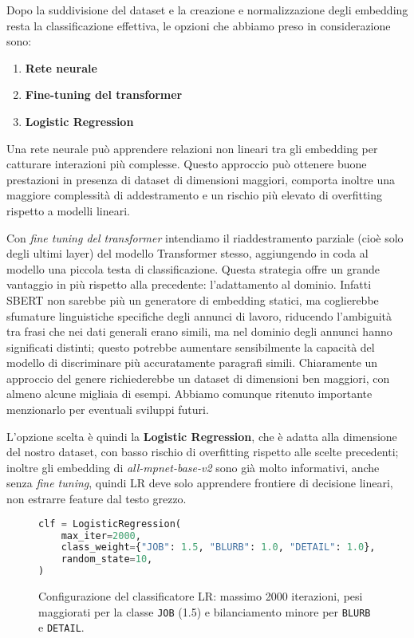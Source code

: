 \noindent Dopo la suddivisione del dataset e la creazione e normalizzazione degli embedding resta la classificazione effettiva, le opzioni che abbiamo preso in considerazione sono:

\begin{enumerate}
    \item \textbf{Rete neurale}
    \item \textbf{Fine-tuning del transformer}
    \item \textbf{Logistic Regression}
\end{enumerate}

\noindent Una rete neurale può apprendere relazioni non lineari tra gli embedding per catturare interazioni più complesse. Questo approccio può ottenere buone prestazioni in presenza di dataset di dimensioni maggiori, comporta inoltre una maggiore complessità di addestramento e un rischio più elevato di overfitting rispetto a modelli lineari.

\noindent Con \textit{fine tuning del transformer} intendiamo il riaddestramento parziale (cioè solo degli ultimi layer) del modello Transformer stesso, aggiungendo in coda al modello una piccola testa di classificazione. Questa strategia offre un grande vantaggio in più rispetto alla precedente: l'adattamento al dominio. Infatti SBERT non sarebbe più un generatore di embedding statici, ma coglierebbe sfumature linguistiche specifiche degli annunci di lavoro, riducendo l’ambiguità tra frasi che nei dati generali erano simili, ma nel dominio degli annunci hanno significati distinti; questo potrebbe aumentare sensibilmente la capacità del modello di discriminare più accuratamente paragrafi simili. Chiaramente un approccio del genere richiederebbe un dataset di dimensioni ben maggiori, con almeno alcune migliaia di esempi. Abbiamo comunque ritenuto importante menzionarlo per eventuali sviluppi futuri.

\noindent L'opzione scelta è quindi la \textbf{Logistic Regression}, che è adatta alla dimensione del nostro dataset, con basso rischio di overfitting rispetto alle scelte precedenti; inoltre gli embedding di \textit{all-mpnet-base-v2} sono già molto informativi, anche senza \textit{fine tuning}, quindi LR deve solo apprendere frontiere di decisione lineari, non estrarre feature dal testo grezzo.

\begin{figure}[H]
    \centering
    \scriptsize
\begin{lstlisting}[language=python]
clf = LogisticRegression(
    max_iter=2000,
    class_weight={"JOB": 1.5, "BLURB": 1.0, "DETAIL": 1.0},
    random_state=10,
)
\end{lstlisting}
    \caption{Configurazione del classificatore LR: massimo 2000 iterazioni, pesi maggiorati per la classe \texttt{JOB} (1.5) e bilanciamento minore per \texttt{BLURB} e \texttt{DETAIL}.}
    \label{fig:clf-lr}
\end{figure}

